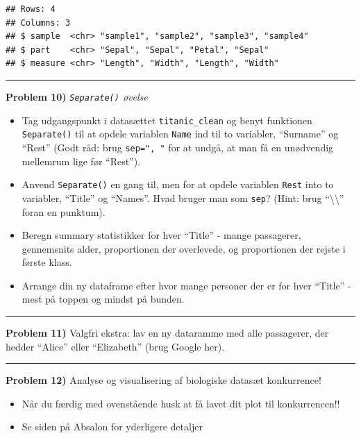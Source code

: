 \documentclass[
]{book}
\providecommand{\tightlist}{%
  \setlength{\itemsep}{0pt}\setlength{\parskip}{0pt}}
\begin{document}
\begin{verbatim}
## Rows: 4
## Columns: 3
## $ sample  <chr> "sample1", "sample2", "sample3", "sample4"
## $ part    <chr> "Sepal", "Sepal", "Petal", "Sepal"
## $ measure <chr> "Length", "Width", "Length", "Width"
\end{verbatim}

\begin{center}\rule{0.5\linewidth}{0.5pt}\end{center}

\textbf{Problem 10)} \emph{\texttt{Separate()} øvelse}

\begin{itemize}
\tightlist
\item
  Tag udgangspunkt i datasættet \texttt{titanic\_clean} og benyt funktionen \texttt{Separate()} til at opdele variablen \texttt{Name} ind til to variabler, ``Surname'' og ``Rest'' (Godt råd: brug \texttt{sep=",\ "} for at undgå, at man få en unødvendig mellemrum lige før ``Rest'').
\item
  Anvend \texttt{Separate()} en gang til, men for at opdele variablen \texttt{Rest} into to variabler, ``Title'' og ``Names''. Hvad bruger man som \texttt{sep}? (Hint: brug ``\textbackslash\textbackslash{}'' foran en punktum).
\item
  Beregn summary statistikker for hver ``Title'' - mange passagerer, gennemsnits alder, proportionen der overlevede, og proportionen der rejste i første klass.
\item
  Arrange din ny dataframe efter hvor mange personer der er for hver ``Title'' - mest på toppen og mindst på bunden.
\end{itemize}

\begin{center}\rule{0.5\linewidth}{0.5pt}\end{center}

\textbf{Problem 11)} Valgfri ekstra: lav en ny dataramme med alle passagerer, der hedder ``Alice'' eller ``Elizabeth'' (brug Google her).

\begin{center}\rule{0.5\linewidth}{0.5pt}\end{center}

\textbf{Problem 12)} Analyse og visualisering af biologiske datasæt konkurrence!

\begin{itemize}
\tightlist
\item
  Når du færdig med ovenstående husk at få lavet dit plot til konkurrencen!!
\item
  Se siden på Absalon for yderligere detaljer
\end{itemize}
\end{document}
